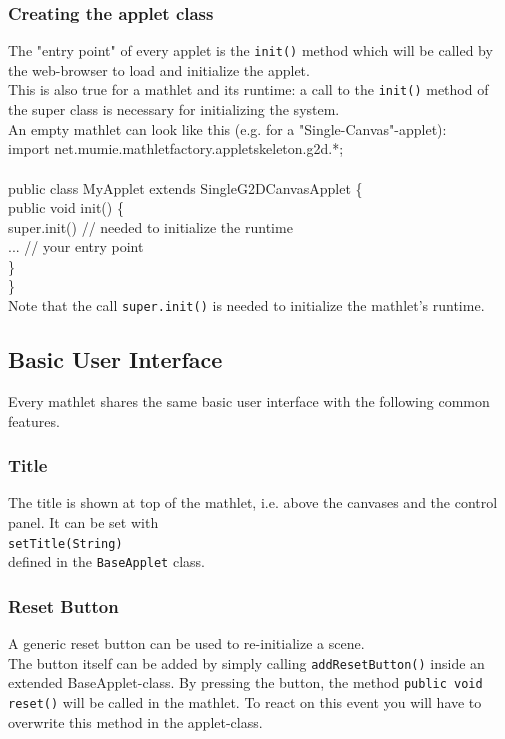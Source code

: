   \subsubsection{Creating the applet class}
  The "entry point" of every applet is the \verb|init()| method which will be called
  by the web-browser to load and initialize the applet.\\
  This is also true for a mathlet and its runtime: a call to the \verb|init()| method of the
  super class is necessary for initializing the system.\\
  An empty mathlet can look like this (e.g. for a "Single-Canvas"-applet):\\
  {\small\ttfamily
  \indent import net.mumie.mathletfactory.appletskeleton.g2d.*;\\\\
  \indent public class MyApplet extends SingleG2DCanvasApplet \{\\
  \indent \indent public void init() \{\\
  \indent \indent \indent super.init() // needed to initialize the runtime\\
  \indent \indent\indent ... // your entry point\\
  \indent \indent \}\\
  \indent \}\\
  }
  Note that the call \verb|super.init()| is needed to initialize the mathlet's runtime.
  
  \subsection{Basic User Interface}
  Every mathlet shares the same basic user interface with the following common features.
  
  \subsubsection{Title}
  The title is shown at top of the mathlet, i.e. above the canvases and the control panel.
  It can be set with\\
  \indent \verb|setTitle(String)|\\
  defined in the \verb|BaseApplet| class.
  
  \subsubsection{Reset Button}
  A generic reset button can be used to re-initialize a scene.\\
  The button itself can be added by simply calling \verb|addResetButton()| inside
  an extended BaseApplet-class. By pressing the button, the method 
  \verb|public void reset()| will be called in the mathlet. To react on this event
  you will have to overwrite this method in the applet-class.  
  
